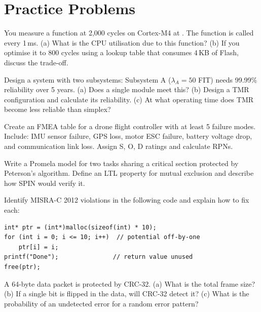 \section{Practice Problems}
\label{sec:ana:practice}

\begin{exercise}
You measure a function at 2{,}000 cycles on Cortex-M4 at . The function is called every 1\,ms. (a) What is the CPU utilisation due to this function? (b) If you optimise it to 800 cycles using a lookup table that consumes 4\,KB of Flash, discuss the trade-off.
\end{exercise}

\begin{exercise}
Design a system with two subsystems: Subsystem A ($\lambda_A = 50$ FIT) needs 99.99\% reliability over 5 years. (a) Does a single module meet this? (b) Design a TMR configuration and calculate its reliability. (c) At what operating time does TMR become less reliable than simplex?
\end{exercise}

\begin{exercise}
Create an FMEA table for a drone flight controller with at least 5 failure modes. Include: IMU sensor failure, GPS loss, motor ESC failure, battery voltage drop, and communication link loss. Assign S, O, D ratings and calculate RPNs.
\end{exercise}

\begin{exercise}
Write a Promela model for two tasks sharing a critical section protected by Peterson's algorithm. Define an LTL property for mutual exclusion and describe how SPIN would verify it.
\end{exercise}

\begin{exercise}
Identify MISRA-C 2012 violations in the following code and explain how to fix each:
\begin{lstlisting}[style=C, numbers=none]
int* ptr = (int*)malloc(sizeof(int) * 10);
for (int i = 0; i <= 10; i++)  // potential off-by-one
    ptr[i] = i;
printf("Done");               // return value unused
free(ptr);
\end{lstlisting}
\end{exercise}

\begin{exercise}
A 64-byte data packet is protected by CRC-32. (a) What is the total frame size? (b) If a single bit is flipped in the data, will CRC-32 detect it? (c) What is the probability of an undetected error for a random error pattern?
\end{exercise}
